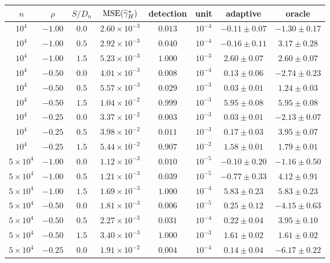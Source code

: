 \begin{table}[H]
\centering
\footnotesize
\setlength{\tabcolsep}{4pt}
\begin{tabular}{cccccccc}
\toprule
$n$ & $\rho$ & $S/D_n$ & $\operatorname{MSE}(\widehat{\gamma}_H^\star)$ & detection & unit & adaptive & oracle\\
\midrule
$10^4$ & $-1.00$ & $0.0$ & $2.60{\times}10^{-3}$ & $0.013$ & $10^{-4}$ & $-0.11\pm0.07$ & $-1.30\pm0.17$\\
$10^4$ & $-1.00$ & $0.5$ & $2.92{\times}10^{-3}$ & $0.040$ & $10^{-4}$ & $-0.16\pm0.11$ & $3.17\pm0.28$\\
$10^4$ & $-1.00$ & $1.5$ & $5.23{\times}10^{-3}$ & $1.000$ & $10^{-3}$ & $2.60\pm0.07$ & $2.60\pm0.07$\\
$10^4$ & $-0.50$ & $0.0$ & $4.01{\times}10^{-3}$ & $0.008$ & $10^{-4}$ & $0.13\pm0.06$ & $-2.74\pm0.23$\\
$10^4$ & $-0.50$ & $0.5$ & $5.57{\times}10^{-3}$ & $0.029$ & $10^{-3}$ & $0.03\pm0.01$ & $1.24\pm0.03$\\
$10^4$ & $-0.50$ & $1.5$ & $1.04{\times}10^{-2}$ & $0.999$ & $10^{-3}$ & $5.95\pm0.08$ & $5.95\pm0.08$\\
$10^4$ & $-0.25$ & $0.0$ & $3.37{\times}10^{-2}$ & $0.003$ & $10^{-3}$ & $0.03\pm0.01$ & $-2.13\pm0.07$\\
$10^4$ & $-0.25$ & $0.5$ & $3.98{\times}10^{-2}$ & $0.011$ & $10^{-3}$ & $0.17\pm0.03$ & $3.95\pm0.07$\\
$10^4$ & $-0.25$ & $1.5$ & $5.44{\times}10^{-2}$ & $0.907$ & $10^{-2}$ & $1.58\pm0.01$ & $1.79\pm0.01$\\
\midrule
$5{\times}10^4$ & $-1.00$ & $0.0$ & $1.12{\times}10^{-3}$ & $0.010$ & $10^{-5}$ & $-0.10\pm0.20$ & $-1.16\pm0.50$\\
$5{\times}10^4$ & $-1.00$ & $0.5$ & $1.21{\times}10^{-3}$ & $0.039$ & $10^{-5}$ & $-0.77\pm0.33$ & $4.12\pm0.91$\\
$5{\times}10^4$ & $-1.00$ & $1.5$ & $1.69{\times}10^{-3}$ & $1.000$ & $10^{-4}$ & $5.83\pm0.23$ & $5.83\pm0.23$\\
$5{\times}10^4$ & $-0.50$ & $0.0$ & $1.81{\times}10^{-3}$ & $0.006$ & $10^{-5}$ & $0.25\pm0.12$ & $-4.15\pm0.63$\\
$5{\times}10^4$ & $-0.50$ & $0.5$ & $2.27{\times}10^{-3}$ & $0.031$ & $10^{-4}$ & $0.22\pm0.04$ & $3.95\pm0.10$\\
$5{\times}10^4$ & $-0.50$ & $1.5$ & $3.40{\times}10^{-3}$ & $1.000$ & $10^{-3}$ & $1.61\pm0.02$ & $1.61\pm0.02$\\
$5{\times}10^4$ & $-0.25$ & $0.0$ & $1.91{\times}10^{-2}$ & $0.004$ & $10^{-4}$ & $0.14\pm0.04$ & $-6.17\pm0.22$\\

\end{tabular}
\end{table}
